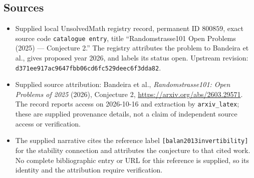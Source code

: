 \documentclass[11pt]{article}
\begin{document}
\subsection{Sources}
\begin{itemize}
\item Supplied local UnsolvedMath registry record, permanent ID \(800859\), exact source code \texttt{catalogue entry}, title ``Randomstrasse101 Open Problems (2025) --- Conjecture 2.'' The registry attributes the problem to Bandeira et al., gives proposed year 2026, and labels its status open. Upstream revision: \texttt{d371ee917ac9647fbb06cd6fc529deec6f3dda82}.
\item Supplied source attribution: Bandeira et al., \emph{Randomstrasse101: Open Problems of 2025} (2026), Conjecture 2, \url{https://arxiv.org/abs/2603.29571}. The record reports access on 2026-10-16 and extraction by \texttt{arxiv\_latex}; these are supplied provenance details, not a claim of independent source access or verification.
\item The supplied narrative cites the reference label \texttt{[balan2013invertibility]} for the stability connection and attributes the conjecture to that cited work. No complete bibliographic entry or URL for this reference is supplied, so its identity and the attribution require verification.
\end{itemize}
\end{document}
